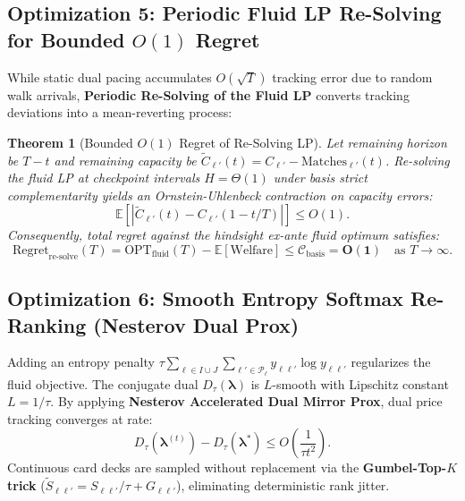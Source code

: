 \documentclass[11pt,letterpaper]{article}
\theoremstyle{definition}
\theoremstyle{plain}
\newtheorem{theorem}{Theorem}[section]
\theoremstyle{remark}
\begin{document}
\subsection{Optimization 5: Periodic Fluid LP Re-Solving for Bounded $O(1)$ Regret}
While static dual pacing accumulates $O(\sqrt{T})$ tracking error due to random walk arrivals, \textbf{Periodic Re-Solving of the Fluid LP} converts tracking deviations into a mean-reverting process:

\begin{theorem}[Bounded $O(1)$ Regret of Re-Solving LP]
\label{thm:resolving_bound}
Let remaining horizon be $T - t$ and remaining capacity be $\tilde{C}_{\ell'}(t) = C_{\ell'} - \mathrm{Matches}_{\ell'}(t)$. Re-solving the fluid LP at checkpoint intervals $H = \Theta(1)$ under basis strict complementarity yields an Ornstein-Uhlenbeck contraction on capacity errors:
\begin{equation}
    \mathbb{E}\left[ |\tilde{C}_{\ell'}(t) - C_{\ell'}(1 - t/T)| \right] \le O(1).
\end{equation}
Consequently, total regret against the hindsight ex-ante fluid optimum satisfies:
\begin{equation}
    \mathrm{Regret}_{\text{re-solve}}(T) = \mathrm{OPT}_{\text{fluid}}(T) - \mathbb{E}[\mathrm{Welfare}] \le \mathcal{C}_{\text{basis}} = \mathbf{O(1)} \quad \text{as } T \to \infty.
\end{equation}
\end{theorem}

\subsection{Optimization 6: Smooth Entropy Softmax Re-Ranking (Nesterov Dual Prox)}
Adding an entropy penalty $\tau \sum_{\ell \in I \cup J} \sum_{\ell' \in \mathcal{P}_\ell} y_{\ell\ell'} \log y_{\ell\ell'}$ regularizes the fluid objective. The conjugate dual $D_\tau(\boldsymbol{\lambda})$ is $L$-smooth with Lipschitz constant $L = 1/\tau$.
By applying \textbf{Nesterov Accelerated Dual Mirror Prox}, dual price tracking converges at rate:
\begin{equation}
    D_\tau(\boldsymbol{\lambda}^{(t)}) - D_\tau(\boldsymbol{\lambda}^*) \le O\left(\frac{1}{\tau t^2}\right).
\end{equation}
Continuous card decks are sampled without replacement via the \textbf{Gumbel-Top-$K$ trick} ($\tilde{S}_{\ell\ell'} = S_{\ell\ell'}/\tau + G_{\ell\ell'}$), eliminating deterministic rank jitter.
\end{document}
